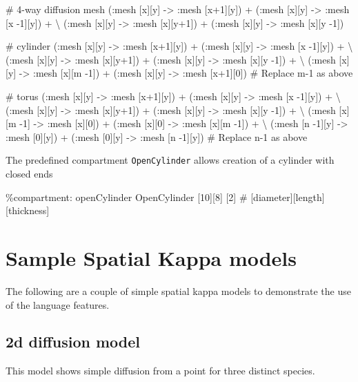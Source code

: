 \begin{kappasource}

# 4-way diffusion mesh
    (:mesh [x][y] -> :mesh [x+1][y]) + (:mesh [x][y] -> :mesh [x -1][y]) + {\textbackslash}
    (:mesh [x][y] -> :mesh [x][y+1]) + (:mesh [x][y] -> :mesh [x][y -1])

# cylinder
    (:mesh [x][y] -> :mesh [x+1][y]) + (:mesh [x][y] -> :mesh [x -1][y]) + {\textbackslash}
    (:mesh [x][y] -> :mesh [x][y+1]) + (:mesh [x][y] -> :mesh [x][y -1]) + {\textbackslash}
    (:mesh [x][y] -> :mesh [x][m -1]) + (:mesh [x][y] -> :mesh [x+1][0]) 
# Replace m-1 as above 

# torus
    (:mesh [x][y] -> :mesh [x+1][y]) + (:mesh [x][y] -> :mesh [x -1][y]) + {\textbackslash}
    (:mesh [x][y] -> :mesh [x][y+1]) + (:mesh [x][y] -> :mesh [x][y -1]) + {\textbackslash}
    (:mesh [x][m -1] -> :mesh [x][0]) + (:mesh [x][0] -> :mesh [x][m -1]) + {\textbackslash}
    (:mesh [n -1][y] -> :mesh [0][y]) + (:mesh [0][y] -> :mesh [n -1][y])
# Replace n-1 as above 
\end{kappasource}

The predefined compartment \verb|OpenCylinder| allows creation of a cylinder with closed ends

\begin{kappasource}
\%compartment: openCylinder  OpenCylinder  [10][8] [2]    # [diameter][length] [thickness]
\end{kappasource}

\newpage
\section{Sample Spatial Kappa models}

The following are a couple of simple spatial kappa models to demonstrate the use of the language features.



\subsection{2d diffusion model}
\label{sec:2dDiffusion}

This model shows simple diffusion from a point for three distinct species.


